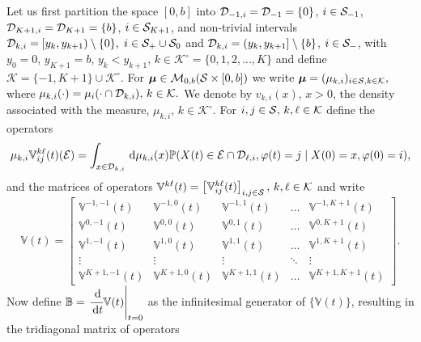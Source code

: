 Let us first partition the space \([0,b]\) into \(\mathcal{D}_{-1,i}=\mathcal{D}_{-1} = \{0\}\), \(i\in\mathcal{S}_{-1}\), \(\mathcal{D}_{{K+1},i}=\mathcal{D}_{{K+1}}=\{b\}\), \(i\in\mathcal{S}_{K+1}\), and non-trivial intervals \(\mathcal{D}_{k,i}=[y_k,y_{k+1})\setminus \{0\},\) \(i\in\mathcal{S}_+\cup\mathcal{S}_0\) and \(\mathcal{D}_{k,i}=(y_k,y_{k+1}]\setminus \{b\}\), \(i\in\mathcal{S}_-\), with \(y_0=0,\,y_{K+1}=b,\, y_k<y_{k+1},\,k\in\mathcal K^\circ=\{0,1,2,...,K\}\) and define \(\mathcal K = \{-1,K+1\}\cup\mathcal K^\circ\). For $\boldsymbol{\mu} \in \mathcal{M}_{0,b}(\mathcal{S} \times [0,b])$ we write \(\boldsymbol{\mu} = (\mu_{k,i})_{i \in \mathcal{S},k\in\mathcal K},\) where $\mu_{k,i}(\cdot) = \mu_i(\cdot \cap \mathcal{D}_{k,i}),\,k\in\mathcal K.$ We denote by \(v_{k,i}(x),\,x>0\), the density associated with the measure, \(\mu_{k,i},\,k\in \mathcal K^\circ\). For \( i,j\in\mathcal{S},\,k,\ell\in\mathcal K\) define the operators 
\[\mu_{k,i} \mathbb V_{ij}^{k \ell}(t)(\mathcal{E}) = \int_{x\in\mathcal{D}_{k,i}} \, \mathrm{d} \mu_{k,i}(x)\mathbb P (X(t) \in\mathcal{E}\cap \mathcal{D}_{\ell,i},\varphi(t) = j \mid X(0) = x, \varphi(0) = i),\]
and the matrices of operators \(\mathbb V^{k\ell}(t) = \begin{bmatrix} \mathbb V_{ij}^{k\ell}(t) \end{bmatrix}_{i,j\in\mathcal S},\,k,\ell\in\mathcal K\) and write 
\[\mathbb V(t) = \left[
	\begin{array}{ccccc}
		\mathbb V^{{-1},{-1}}(t)&\mathbb V^{{-1},0}(t)& \mathbb V^{{-1},1}(t) &\hdots & \mathbb V^{{-1},{K+1}}(t)\\
		\mathbb V^{0,{-1}}(t)&\mathbb V^{0,0}(t)&\mathbb V^{0,1}(t)&\hdots&\mathbb V^{0,{K+1}}(t)\\
		\mathbb V^{1,{-1}}(t)&\mathbb V^{1,0}(t)&\mathbb V^{1,1}(t)&\hdots&\mathbb V^{1,{K+1}}(t)\\
		\vdots & \vdots & \vdots & \ddots & \vdots \\
		\mathbb V^{{K+1},{-1}}(t) &\mathbb V^{{K+1},0}(t) &\mathbb V^{{K+1},1}(t) & \hdots & \mathbb V^{{K+1},{K+1}}(t) 
	\end{array}\right].\]
Now define \(\mathbb B=\left.\cfrac{\, \mathrm{d}}{\, \mathrm{d} t}\mathbb V(t)\right|_{t=0}\) as the infinitesimal generator of \(\{\mathbb V(t)\}\), resulting in the tridiagonal matrix of operators 
